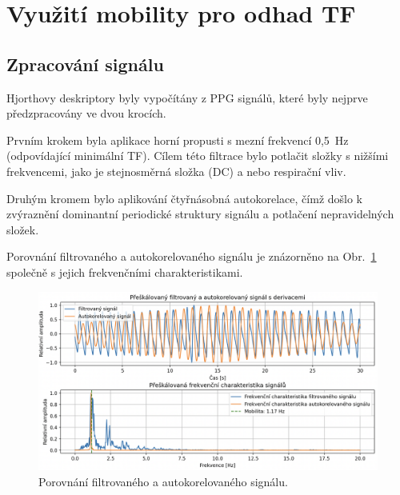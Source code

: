 \section{Využití mobility pro odhad TF}
\label{sec:hjorth_mobilita_TF}

\subsection*{Zpracování signálu}
\label{sec:zpracovani}
Hjorthovy deskriptory byly vypočítány z \acs{PPG} signálů, které byly nejprve předzpracovány ve dvou krocích.

Prvním krokem byla aplikace horní propusti s mezní frekvencí 0,5~Hz (odpovídající minimální \acs{TF}).
Cílem této filtrace bylo potlačit složky s nižšími frekvencemi, jako je stejnosměrná složka (\acs{DC}) a nebo respirační vliv.

Druhým kromem bylo aplikování čtyřnásobná autokorelace, čímž došlo k zvýraznění dominantní periodické struktury signálu a potlačení nepravidelných složek. %

Porovnání filtrovaného a autokorelovaného signálu je znázorněno na Obr.~\ref{fig:hjorth_autocorr} společně s jejich frekvenčními charakteristikami.

\begin{figure}[t]
	\centering
	\includegraphics[width=1\textwidth]{./obrazky/hjorth_autocorr_freq.png}
	\caption[Porovnání filtrovaného a autokorelovaného signálu]{Porovnání filtrovaného a autokorelovaného signálu.}
	\label{fig:hjorth_autocorr}
\end{figure}

